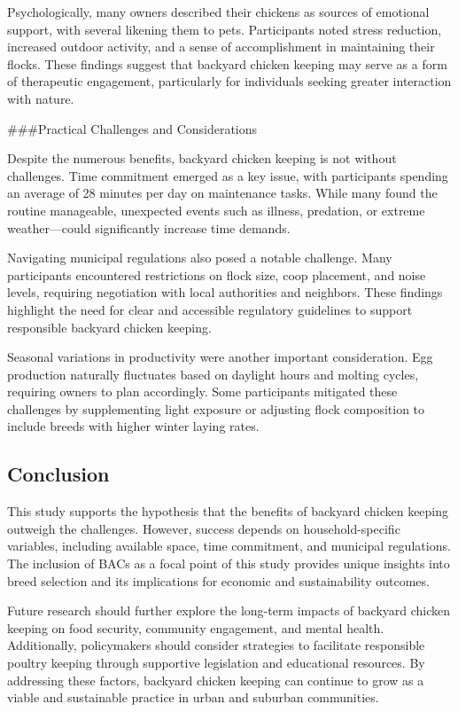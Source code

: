 \documentclass[
  man,
  floatsintext,
  longtable,
  nolmodern,
  notxfonts,
  notimes,
  colorlinks=true,linkcolor=blue,citecolor=blue,urlcolor=blue]{apa7}
\begin{document}
Psychologically, many owners described their chickens as sources of
emotional support, with several likening them to pets. Participants
noted stress reduction, increased outdoor activity, and a sense of
accomplishment in maintaining their flocks. These findings suggest that
backyard chicken keeping may serve as a form of therapeutic engagement,
particularly for individuals seeking greater interaction with nature.

\#\#\#Practical Challenges and Considerations

Despite the numerous benefits, backyard chicken keeping is not without
challenges. Time commitment emerged as a key issue, with participants
spending an average of 28 minutes per day on maintenance tasks. While
many found the routine manageable, unexpected events such as illness,
predation, or extreme weather---could significantly increase time
demands.

Navigating municipal regulations also posed a notable challenge. Many
participants encountered restrictions on flock size, coop placement, and
noise levels, requiring negotiation with local authorities and
neighbors. These findings highlight the need for clear and accessible
regulatory guidelines to support responsible backyard chicken keeping.

Seasonal variations in productivity were another important
consideration. Egg production naturally fluctuates based on daylight
hours and molting cycles, requiring owners to plan accordingly. Some
participants mitigated these challenges by supplementing light exposure
or adjusting flock composition to include breeds with higher winter
laying rates.

\subsection{Conclusion}\label{conclusion}

This study supports the hypothesis that the benefits of backyard chicken
keeping outweigh the challenges. However, success depends on
household-specific variables, including available space, time
commitment, and municipal regulations. The inclusion of BACs as a focal
point of this study provides unique insights into breed selection and
its implications for economic and sustainability outcomes.

Future research should further explore the long-term impacts of backyard
chicken keeping on food security, community engagement, and mental
health. Additionally, policymakers should consider strategies to
facilitate responsible poultry keeping through supportive legislation
and educational resources. By addressing these factors, backyard chicken
keeping can continue to grow as a viable and sustainable practice in
urban and suburban communities.
\end{document}
